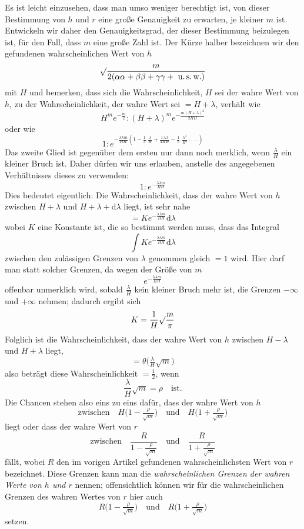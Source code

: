 Es ist leicht einzusehen, dass man umso weniger berechtigt ist, von dieser Bestimmung von \(h\) und \(r\) eine große Genauigkeit zu erwarten, je kleiner \(m\) ist. Entwickeln wir daher den Genauigkeitsgrad, der dieser Bestimmung beizulegen ist, für den Fall, dass \(m\) eine große Zahl ist. Der Kürze halber bezeichnen wir den gefundenen wahrscheinlichen Wert von \(h\)
\[
\surd\frac{m}{2(\alpha\alpha+\beta\beta+\gamma\gamma+\text{ u.\,s.\,w.})}
\]
mit \(H\) und bemerken, dass sich die Wahrscheinlichkeit, \(H\) sei der
%
wahre Wert von \(h\), zu der Wahrscheinlichkeit, der wahre Wert sei \(=H+\lambda\), verhält wie
\[
H^m e^{-\frac m2}:(H+\lambda)^m e^{-\frac{m(H+\lambda)^2}{2HH}}
\]
oder wie
\[
1:e^{-\frac{\lambda\lambda m}{HH}(1-\frac13.\frac\lambda H+\frac{1\,\lambda\lambda}{4HH}-\frac15.\frac{\lambda^3}{H^3}\, .\,.\,.\,.)}
\]
Das zweite Glied ist gegenüber dem ersten nur dann noch merklich, wenn \(\frac\lambda H\) ein kleiner Bruch ist. Daher dürfen wir uns erlauben, anstelle des angegebenen Verhältnisses dieses zu verwenden:
\[
1:e^{-\frac{\lambda\lambda m}{HH}}
\]
Dies bedeutet eigentlich: Die Wahrscheinlichkeit, dass der wahre Wert von \(h\) zwischen \(H+\lambda\) und \(H+\lambda+\mathrm{d}\lambda\) liegt, ist sehr nahe
\[
=Ke^{-\frac{\lambda\lambda m}{HH}}\mathrm{d}\lambda
\]
wobei \(K\) eine Konstante ist, die so bestimmt werden muss, dass das Integral
\[
\int Ke^{-\frac{\lambda\lambda m}{HH}}\mathrm{d}\lambda
\]
zwischen den zulässigen Grenzen von \(\lambda\) genommen gleich \(=1\) wird. Hier darf man statt solcher Grenzen, da wegen der Größe von \(m\)
\[
e^{-\frac{\lambda\lambda m}{HH}}
\]
offenbar unmerklich wird, sobald \(\frac\lambda H\) kein kleiner Bruch mehr ist, die Grenzen \(-\infty\) und \(+\infty\) nehmen; dadurch ergibt sich
\[
K=\frac1H\surd\frac m\pi
\]
Folglich ist die Wahrscheinlichkeit, dass der wahre Wert von \(h\) zwischen \(H-\lambda\) und \(H+\lambda\) liegt,
\[
=\theta\bigl(\tfrac\lambda H\surd m\bigr)
\]
also beträgt diese Wahrscheinlichkeit \(=\frac12\), wenn
\[
\frac\lambda H\surd m=\rho\quad\text{ist.}
\]
%
Die Chancen stehen also eins zu eins dafür, dass der wahre Wert von \(h\)
\[
\text{zwischen}\quad H\bigl(1-\tfrac\rho{\surd m}\bigr)\quad\text{und}\quad H\bigl(1+\tfrac\rho{\surd m}\bigr)
\]
liegt oder dass der wahre Wert von \(r\)
\[
\text{zwischen}\quad\frac{R}{1-\frac\rho{\surd m}}\quad\text{und}\quad\frac{R}{1+\frac\rho{\surd m}}
\]
fällt, wobei \(R\) den im vorigen Artikel gefundenen wahrscheinlichsten Wert von \(r\) bezeichnet. Diese Grenzen kann man die \textit{wahrscheinlichen Grenzen der wahren Werte von \(h\) und \(r\)} nennen; offensichtlich können wir für die wahrscheinlichen Grenzen des wahren Wertes von \(r\) hier auch
\[
R\bigl(1-\tfrac\rho{\surd m}\bigr)\quad\text{und}\quad R\bigl(1+\tfrac\rho{\surd m}\bigr)
\]
setzen.

